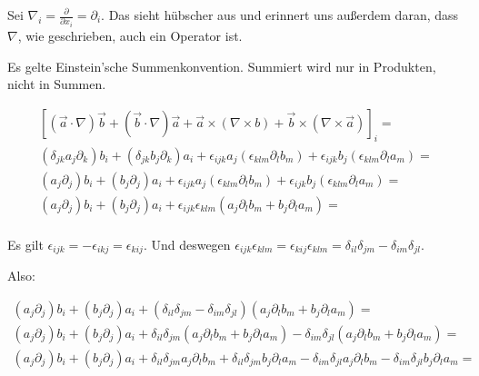 \documentclass[a4paper,german,12pt,smallheadings]{scrartcl}
\begin{document}
Sei $\nabla_i = \frac{\partial}{\partial x_i} = \partial_i$. Das sieht hübscher
aus und erinnert uns außerdem daran, dass $\nabla$, wie geschrieben, auch ein
Operator ist.

Es gelte Einstein'sche Summenkonvention. Summiert wird nur in Produkten, nicht in Summen.

\begin{align*}
  \left[(\vec{a}\cdot\nabla)\vec{b} + (\vec{b}\cdot\nabla)\vec{a} + \vec{a} \times (\nabla \times b) + \vec{b} \times (\nabla \times \vec{a})\right]_i = \\
  (\delta_{jk}a_j\partial_k)b_i + (\delta_{jk}b_j\partial_k)a_i + \epsilon_{ijk}a_j(\epsilon_{klm}\partial_lb_m) + \epsilon_{ijk} b_j (\epsilon_{klm} \partial_l a_m) =\\
  (a_j\partial_j)b_i + (b_j\partial_j)a_i + \epsilon_{ijk}a_j(\epsilon_{klm}\partial_lb_m) + \epsilon_{ijk} b_j (\epsilon_{klm} \partial_l a_m) =\\
  (a_j\partial_j)b_i + (b_j\partial_j)a_i + \epsilon_{ijk}\epsilon_{klm} (a_j\partial_lb_m + b_j\partial_l a_m) =\\
\end{align*}

Es gilt $\epsilon_{ijk} = -\epsilon_{ikj} = \epsilon_{kij}$. Und deswegen
$\epsilon_{ijk}\epsilon_{klm} = \epsilon_{kij}\epsilon_{klm} =
\delta_{il}\delta_{jm} - \delta_{im}\delta_{jl}$.

Also:

\begin{align*}
  (a_j\partial_j)b_i + (b_j\partial_j)a_i + (\delta_{il}\delta_{jm} - \delta_{im}\delta_{jl}) (a_j\partial_lb_m + b_j\partial_l a_m) =\\
  (a_j\partial_j)b_i + (b_j\partial_j)a_i + \delta_{il}\delta_{jm}(a_j\partial_lb_m + b_j\partial_l a_m) - \delta_{im}\delta_{jl}(a_j\partial_lb_m + b_j\partial_l a_m) =\\
  (a_j\partial_j)b_i + (b_j\partial_j)a_i + \delta_{il}\delta_{jm}a_j\partial_lb_m + \delta_{il}\delta_{jm}b_j\partial_l a_m - \delta_{im}\delta_{jl}a_j\partial_lb_m - \delta_{im}\delta_{jl}b_j\partial_l a_m =\\
\end{align*}
\end{document}
